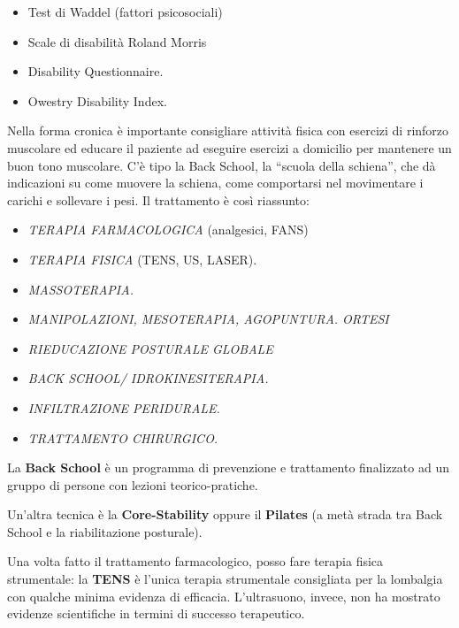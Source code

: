 \begin{itemize}
\item
  Test di Waddel (fattori psicosociali)
\item
  Scale di disabilità Roland Morris
\item
  Disability Questionnaire.
\item
  Owestry Disability Index.
\end{itemize}

 
Nella forma cronica è importante consigliare attività fisica con
esercizi di rinforzo muscolare ed educare il paziente ad eseguire
esercizi a domicilio per mantenere un buon tono muscolare. C'è tipo la
Back School, la ``scuola della schiena'', che dà indicazioni su come
muovere la schiena, come comportarsi nel movimentare i carichi e
sollevare i pesi. Il trattamento è così riassunto:
 

\begin{itemize}
\item
   
  \emph{TERAPIA FARMACOLOGICA} (analgesici, FANS)
   

\item
  \emph{TERAPIA FISICA} (TENS, US, LASER).

\item
  \emph{MASSOTERAPIA. }

\item
  \emph{MANIPOLAZIONI, MESOTERAPIA, AGOPUNTURA. ORTESI}

\item
   
  \emph{RIEDUCAZIONE POSTURALE GLOBALE}

\item
  \emph{BACK SCHOOL/ IDROKINESITERAPIA. }
\item
  \emph{INFILTRAZIONE PERIDURALE. }

\item
  \emph{TRATTAMENTO CHIRURGICO. }
\end{itemize}

La \textbf{Back School} è un programma di prevenzione e trattamento
finalizzato ad un gruppo di persone con lezioni teorico-pratiche.

Un'altra tecnica è la \textbf{Core-Stability} oppure il \textbf{Pilates}
(a metà strada tra Back School e la riabilitazione posturale).

Una volta fatto il trattamento farmacologico, posso fare terapia fisica
strumentale: la \textbf{TENS} è l'unica terapia strumentale consigliata
per la lombalgia con qualche minima evidenza di efficacia. L'ultrasuono,
invece, non ha mostrato evidenze scientifiche in termini di successo
terapeutico.


